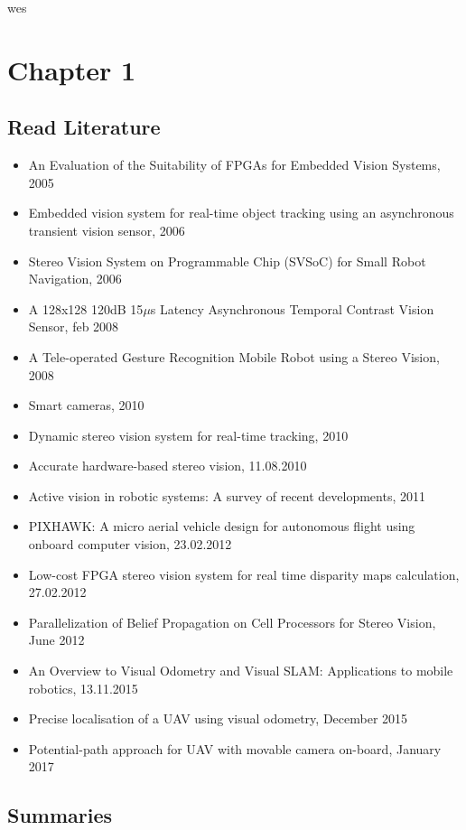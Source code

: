 wes\chapter{Chapter 1}
\label{ch:one}

\section{Read Literature}
\begin{itemize}
	\item An Evaluation of the Suitability of FPGAs for Embedded Vision Systems, 2005
	\item Embedded vision system for real-time object tracking using an asynchronous transient vision sensor, 2006
	\item Stereo Vision System on Programmable Chip (SVSoC) for Small Robot Navigation, 2006
	\item A 128x128 120dB 15$\mu$s Latency Asynchronous Temporal Contrast Vision Sensor, feb 2008
	\item A Tele-operated Gesture Recognition Mobile Robot using a Stereo Vision, 2008
	\item Smart cameras, 2010
	\item Dynamic stereo vision system for real-time tracking, 2010
	\item Accurate hardware-based stereo vision, 11.08.2010
	\item Active vision in robotic systems: A survey of recent developments, 2011
	\item PIXHAWK: A micro aerial vehicle design for autonomous flight using onboard computer vision, 23.02.2012
	\item Low-cost FPGA stereo vision system for real time disparity maps calculation, 27.02.2012
	\item Parallelization of Belief Propagation on Cell Processors for Stereo Vision, June 2012
	\item An Overview to Visual Odometry and Visual SLAM: Applications to mobile robotics, 13.11.2015
	\item Precise localisation of a UAV using visual odometry, December 2015
	\item Potential-path approach for UAV with movable camera on-board, January 2017
\end{itemize}

\section{Summaries}
